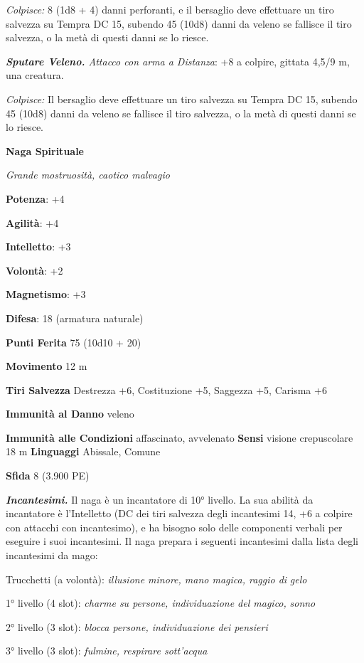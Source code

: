 \begin{multicols}{2}
\emph{Colpisce:} 8 (1d8 + 4) danni perforanti, e il bersaglio deve
effettuare un tiro salvezza su Tempra DC 15, subendo 45 (10d8)
danni da veleno se fallisce il tiro salvezza, o la metà di questi danni
se lo riesce.

\emph{\textbf{Sputare Veleno.} Attacco con arma a Distanza}: +8 a
colpire, gittata 4,5/9 m, una creatura.

\emph{Colpisce:} Il bersaglio deve effettuare un tiro salvezza su Tempra DC 15, subendo 45 (10d8) danni da veleno se fallisce il
tiro salvezza, o la metà di questi danni se lo riesce.

\textbf{Naga Spirituale}

\emph{Grande mostruosità, caotico malvagio}

\textbf{Potenza}: +4

\textbf{Agilità}: +4

\textbf{Intelletto}: +3

\textbf{Volontà}: +2

\textbf{Magnetismo}: +3

\textbf{Difesa}: 18 (armatura naturale)

\textbf{Punti Ferita} 75 (10d10 + 20)

\textbf{Movimento} 12 m

\textbf{Tiri Salvezza} Destrezza +6, Costituzione +5, Saggezza +5,
Carisma +6

\textbf{Immunità al Danno} veleno

\textbf{Immunità alle Condizioni} affascinato, avvelenato \textbf{Sensi}
visione crepuscolare 18 m \textbf{Linguaggi} Abissale,
Comune

\textbf{Sfida} 8 (3.900 PE)

\emph{\textbf{Incantesimi.}} Il naga è un incantatore di 10° livello. La
sua abilità da incantatore è l'Intelletto (DC dei tiri salvezza degli
incantesimi 14, +6 a colpire con attacchi con incantesimo), e ha bisogno
solo delle componenti verbali per eseguire i suoi incantesimi. Il naga
prepara i seguenti incantesimi dalla lista degli incantesimi da mago:

Trucchetti (a volontà): \emph{illusione minore, mano magica, raggio di}
\emph{gelo}

1° livello (4 slot): \emph{charme su persone, individuazione del
magico,} \emph{sonno}

2° livello (3 slot): \emph{blocca persone, individuazione dei pensieri}

3° livello (3 slot): \emph{fulmine, respirare sott'acqua}


\end{multicols}
